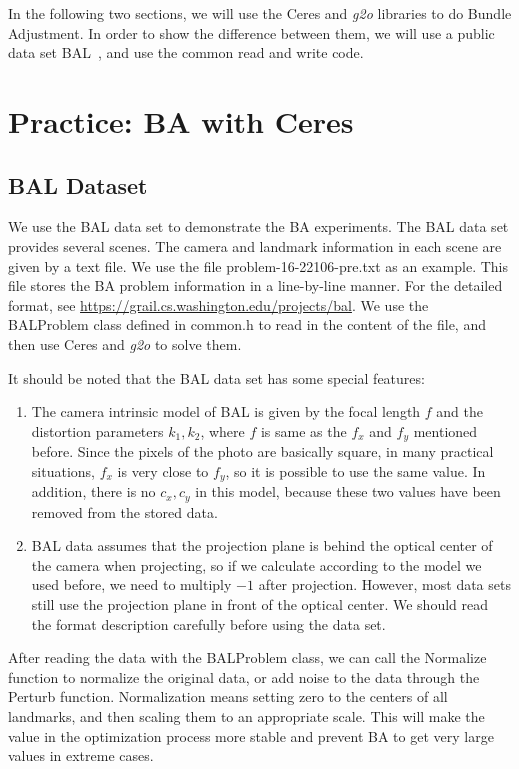 In the following two sections, we will use the Ceres and \textit{g2o} libraries to do Bundle Adjustment. In order to show the difference between them, we will use a public data set BAL~\cite{bundleadjustmentinlarge}, and use the common read and write code.

\section{Practice: BA with Ceres}
\subsection{BAL Dataset}
We use the BAL data set to demonstrate the BA experiments. The BAL data set provides several scenes. The camera and landmark information in each scene are given by a text file. We use the file problem-16-22106-pre.txt as an example. This file stores the BA problem information in a line-by-line manner. For the detailed format, see \url{https://grail.cs.washington.edu/projects/bal}. We use the BALProblem class defined in common.h to read in the content of the file, and then use Ceres and \textit{g2o} to solve them.

It should be noted that the BAL data set has some special features:
\begin{enumerate}
	\item  The camera intrinsic model of BAL is given by the focal length $f$ and the distortion parameters $k_1,k_2$, where $f$ is same as the $f_x$ and $f_y$ mentioned before. Since the pixels of the photo are basically square, in many practical situations, $f_x$ is very close to $f_y$, so it is possible to use the same value. In addition, there is no $c_x, c_y$ in this model, because these two values have been removed from the stored data.
	\item BAL data assumes that the projection plane is behind the optical center of the camera when projecting, so if we calculate according to the model we used before, we need to multiply $-1$ after projection. However, most data sets still use the projection plane in front of the optical center. We should read the format description carefully before using the data set.
\end{enumerate}

After reading the data with the BALProblem class, we can call the Normalize function to normalize the original data, or add noise to the data through the Perturb function. Normalization means setting zero to the centers of all landmarks, and then scaling them to an appropriate scale. This will make the value in the optimization process more stable and prevent BA to get very large values in extreme cases.

